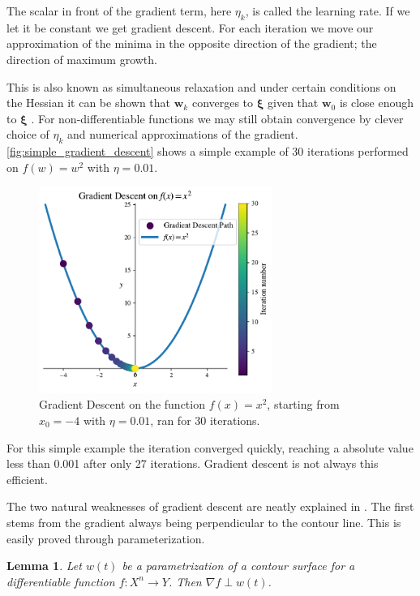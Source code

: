 \documentclass{article}
\newtheorem{lemma}[theorem]{Lemma}
\theoremstyle{definition}
\begin{document}
The scalar in front of the gradient term, here $\eta_k$, is called the learning rate. If we let it be constant we get gradient descent. For each iteration we move our approximation of the minima in the opposite direction of the gradient; the direction of maximum growth. 

This is also known as simultaneous relaxation and under certain conditions on the Hessian it can be shown that $\boldsymbol{w}_k$ converges to $\boldsymbol{\xi}$  given that $\boldsymbol{w}_0$ is close enough to $\boldsymbol{\xi}$ \parencite[p.~117--118]{introNumeric}. For non-differentiable functions we may still obtain convergence by clever choice of $\eta_k$ and numerical approximations of the gradient. \autoref{fig:simple_gradient_descent} shows a simple example of 30 iterations performed on $f(w) = w^2$ with $\eta = 0.01$.

\begin{figure}[H]
    \centering
    \includegraphics[width=0.68\textwidth]{figures/simple_gradient_descent_x^2.pdf}
    \caption{Gradient Descent on the function $f(x)=x^2$, starting from $x_0 = -4$ with $\eta = 0.01$, ran for 30 iterations.}
    \label{fig:simple_gradient_descent}
\end{figure}
For this simple example the iteration converged quickly, reaching a absolute value less than 0.001 after only 27 iterations. Gradient descent is not always this efficient. 

The two natural weaknesses of gradient descent are neatly explained in \textcite[p.~65--71]{MLRefined}. The first stems from the gradient always being perpendicular to the contour line. This is easily proved through parameterization.

\begin{lemma}
    Let $w(t)$ be a parametrization of a contour surface for a differentiable function $f: X^n \rightarrow Y$. Then $\nabla f \perp w(t)$. 
\end{lemma}
\end{document}
